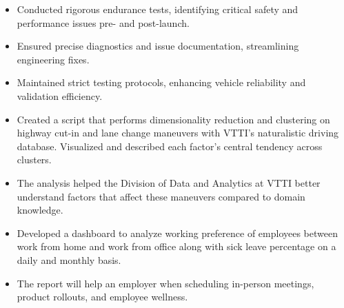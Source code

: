 \documentclass[10pt,a4paper,ragged2e]{altacv}
\begin{document}
\divider

\begin{itemize}
\item Conducted rigorous endurance tests, identifying critical safety and performance issues pre- and post-launch.
\smallskip
\item Ensured precise diagnostics and issue documentation, streamlining engineering fixes.
\smallskip
\item Maintained strict testing protocols, enhancing vehicle reliability and validation efficiency.
\end{itemize}

%
%

\begin{itemize}
\item Created a script that performs dimensionality reduction and clustering on highway cut-in and lane change maneuvers with VTTI's naturalistic driving database. Visualized and described each factor's central tendency across clusters.
\item The analysis helped the Division of Data and Analytics at VTTI better understand factors that affect these maneuvers compared to domain knowledge.
\end{itemize}

\divider

\begin{itemize}
\item Developed a dashboard to analyze working preference of employees between work from home and work from office along with sick leave percentage on a daily and monthly basis.
\item The report will help an employer when scheduling in-person meetings, product rollouts, and employee wellness.
\end{itemize}

\clearpage
\end{document}
